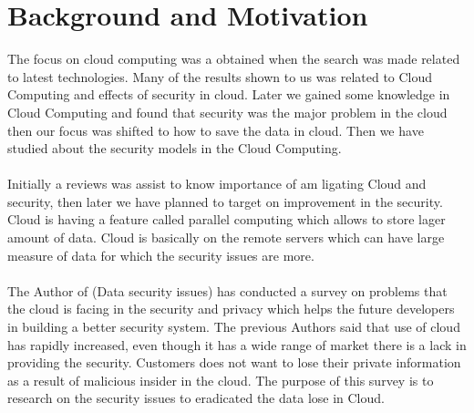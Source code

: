 \section{Background and Motivation}

The focus on cloud computing was a obtained when the search was made related to latest technologies. Many of the results shown to us was related to Cloud Computing and effects of security in cloud. Later we gained some knowledge in Cloud Computing and found that security was the major problem in the cloud then our focus was shifted to how to save the data in cloud. Then we have studied about the security models in the Cloud Computing.

\paragraph{}
Initially a reviews was assist to know importance of am ligating Cloud and security, then later we have planned to target on improvement in the security. Cloud is having a feature called parallel computing which allows to store lager amount of data. Cloud is basically on the remote servers which can have large measure of data for which the security issues are more.

\paragraph{}
 The Author of (Data security issues) has conducted a survey on problems that the cloud is facing in the security and privacy which helps the future developers in building a better security system.
The previous Authors said that use of cloud has rapidly increased, even though it has a wide range of market there is a lack in providing the security. Customers does not want to lose their private information as a result of malicious insider in the cloud. The purpose of this survey is to research on the security issues to eradicated the data lose in Cloud.
